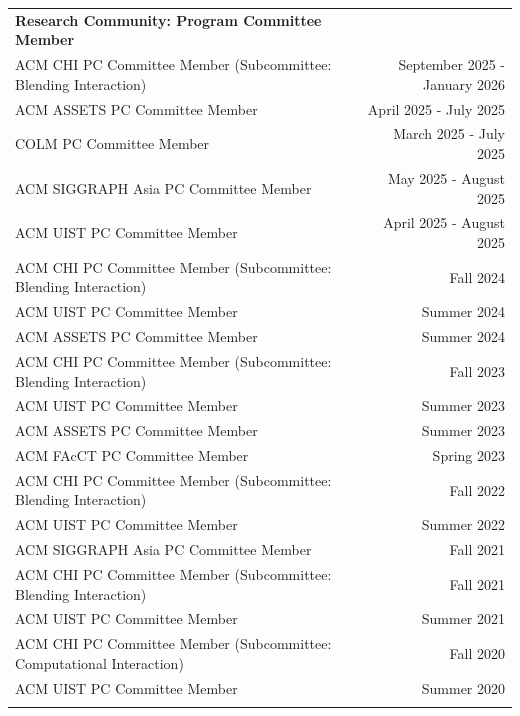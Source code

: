 \begin{longtable}{Xr}
	\textbf{Research Community: Program Committee Member} &  \\
	ACM CHI PC Committee Member (Subcommittee: Blending Interaction) & September 2025 - January 2026 \\
	ACM ASSETS PC Committee Member & April 2025 - July 2025 \\
	COLM PC Committee Member & March 2025 - July 2025 \\
	ACM SIGGRAPH Asia PC Committee Member & May 2025 - August 2025 \\
	ACM UIST PC Committee Member & April 2025 - August 2025 \\
	ACM CHI PC Committee Member (Subcommittee: Blending Interaction) & Fall 2024 \\
	ACM UIST PC Committee Member & Summer 2024 \\
	ACM ASSETS PC Committee Member & Summer 2024 \\
	ACM CHI PC Committee Member (Subcommittee: Blending Interaction) & Fall 2023 \\
	ACM UIST PC Committee Member & Summer 2023 \\
	ACM ASSETS PC Committee Member & Summer 2023 \\
	ACM FAcCT PC Committee Member & Spring 2023 \\
	ACM CHI PC Committee Member (Subcommittee: Blending Interaction) & Fall 2022 \\
	ACM UIST PC Committee Member & Summer 2022 \\
	ACM SIGGRAPH Asia PC Committee Member & Fall 2021 \\
	ACM CHI PC Committee Member (Subcommittee: Blending Interaction) & Fall 2021 \\
	ACM UIST PC Committee Member & Summer 2021 \\
	ACM CHI PC Committee Member (Subcommittee: Computational Interaction) & Fall 2020 \\
	ACM UIST PC Committee Member & Summer 2020 \\
	\\


\end{longtable}
